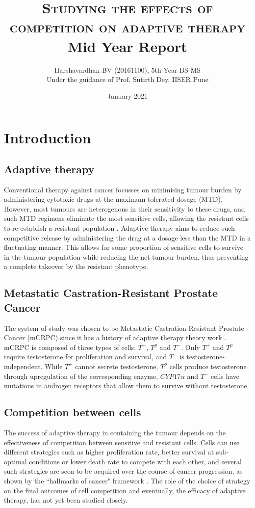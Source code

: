 \documentclass[11pt,a4paper]{article}
\title{\textsc{Studying the effects of competition on adaptive therapy}\\\Large{Mid Year Report}}
\author{Harshavardhan BV (20161100), 5th Year BS-MS\\
Under the guidance of Prof. Sutirth Dey, IISER Pune}
\date{January 2021}
\begin{document}
\maketitle

\section{Introduction}
\subsection{Adaptive therapy}
Conventional therapy against cancer focusses on minimising tumour burden by administering cytotoxic drugs at the maximum tolerated dosage (MTD). However, most tumours are heterogenous in their sensitivity to these drugs, and such MTD regimens eliminate the most sensitive cells, allowing the resistant cells to re-establish a resistant population \cite{Scott}. Adaptive therapy aims to reduce such competitive release by administering the drug at a dosage less than the MTD in a fluctuating manner. This allows for some proportion of sensitive cells to survive in the tumour population while reducing the net tumour burden, thus preventing a complete takeover by the resistant phenotype.

\subsection{Metastatic Castration-Resistant Prostate Cancer}
The system of study was chosen to be Metastatic Castration-Resistant Prostate Cancer (mCRPC) since it has a history of adaptive therapy theory work \cite{Cunningham}. mCRPC is composed of three types of cells: $T^+$, $T^p$ and $T^-$. Only $T^+$ and $T^p$ require testosterone for proliferation and survival, and $T^-$ is testosterone-independent. While $T^+$ cannot secrete testosterone, $T^p$ cells produce testosterone through upregulation of the corresponding enzyme, $CYP17\alpha$ and $T^-$ cells have mutations in androgen receptors that allow them to survive without testosterone.

\subsection{Competition between cells}
The success of adaptive therapy in containing the tumour depends on the effectiveness of competition between sensitive and resistant cells. Cells can use different strategies such as higher proliferation rate, better survival at sub-optimal conditions or lower death rate to compete with each other, and several such strategies are seen to be acquired over the course of cancer progression, as shown by the ``hallmarks of cancer" framework \cite{Hanahan}. The role of the choice of strategy on the final outcomes of cell competition and eventually, the efficacy of adaptive therapy, has not yet been studied closely.
\end{document}
